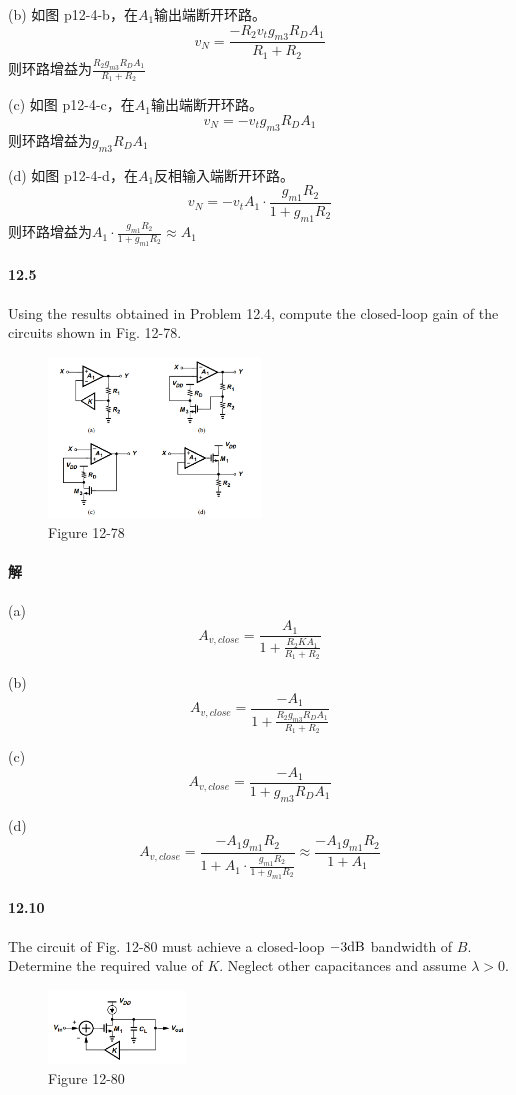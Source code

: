 \documentclass[hyperref, UTF8]{ctexart}
\newcommand{\decibel}{{\rm dB}}
\begin{document}
    (b) 如图 p12-4-b，在$A_1$输出端断开环路。
    $$v_N = \frac{-R_2v_tg_{m3}R_DA_1}{R_1+R_2}$$
    则环路增益为$\frac{R_2g_{m3}R_DA_1}{R_1+R_2}$

    (c) 如图 p12-4-c，在$A_1$输出端断开环路。
    $$v_N = -v_tg_{m3}R_DA_1$$
    则环路增益为$g_{m3}R_DA_1$

    (d) 如图 p12-4-d，在$A_1$反相输入端断开环路。
    $$v_N = -v_tA_1 \cdot \frac{g_{m1}R_2}{1+g_{m1}R_2}$$
    则环路增益为$A_1 \cdot \frac{g_{m1}R_2}{1+g_{m1}R_2} \approx A_1$

\paragraph{12.5} \label{12.5}
    Using the results obtained in Problem 12.4, compute the closed-loop gain of the circuits shown in Fig. 12-78.
    \begin{figure}[!htb]
        \centering
        \includegraphics[width=0.505\textwidth]{p12-78.png}
        \caption*{Figure 12-78}
    \end{figure}        
\paragraph{解}
    (a) 
    $$A_{v,close} = \frac{A_1}{1+\frac{R_2KA_1}{R_1+R_2}}$$

    (b) 
    $$A_{v,close} = \frac{-A_1}{1 + \frac{R_2g_{m3}R_DA_1}{R_1+R_2}}$$

    (c)
    $$A_{v,close} = \frac{-A_1}{1 + g_{m3}R_DA_1}$$

    (d)
    $$A_{v,close} = \frac{-A_1g_{m1}R_2}{1+A_1 \cdot \frac{g_{m1}R_2}{1+g_{m1}R_2}} \approx \frac{-A_1g_{m1}R_2}{1+A_1}$$
\paragraph{12.10} \label{12.10}
    The circuit of Fig. 12-80 must achieve a closed-loop $-3\decibel$ bandwidth of $B$. Determine the required value of $K$. Neglect other capacitances and assume $\lambda > 0$.
    \begin{figure}[!htb]
        \centering
        \includegraphics[width=0.325\textwidth]{p12-80.png}
        \caption*{Figure 12-80}
    \end{figure}        
\end{document}
